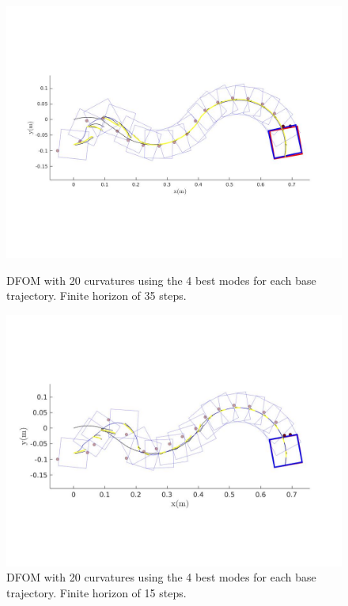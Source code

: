 \documentclass[12,twoside]{TFG-GM}
\theoremstyle{definition}
\theoremstyle{remark}
\begin{document}
\begin{figure}
    \centering
    \begin{minipage}{0.7\textwidth}
        \centering
        \includegraphics[width=1\textwidth] {dfom_trajectory_long_horizon.jpg} \label{fig:dfom_trajectory_long_horizon}%
        \caption{DFOM with 20 curvatures using the 4 best modes for each base trajectory. Finite horizon of 35 steps.}
    \end{minipage}
    \begin{minipage}{0.7\textwidth}
        \centering
        \includegraphics[width=1\textwidth]{dfom_trajectory_short_horizon_15_steps.jpg} %
        \caption{DFOM with 20 curvatures using the 4 best modes for each base trajectory. Finite horizon of 15 steps.}\label{fig:dfom_trajectory_short_horizon}
    \end{minipage}
\end{figure}
\end{document}
